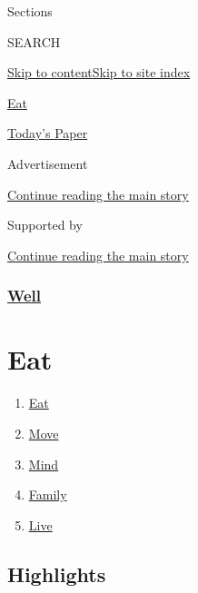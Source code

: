 Sections

SEARCH

\protect\hyperlink{site-content}{Skip to
content}\protect\hyperlink{site-index}{Skip to site index}

\href{https://www.nytimes3xbfgragh.onion/section/well/eat}{Eat}

\href{https://myaccount.nytimes3xbfgragh.onion/auth/login?response_type=cookie\&client_id=vi}{}

\href{https://www.nytimes3xbfgragh.onion/section/todayspaper}{Today's
Paper}

Advertisement

\protect\hyperlink{after-top}{Continue reading the main story}

Supported by

\protect\hyperlink{after-sponsor}{Continue reading the main story}

\hypertarget{well}{%
\subsubsection{\texorpdfstring{\href{/section/well}{Well}}{Well}}\label{well}}

\hypertarget{eat}{%
\section{Eat}\label{eat}}

\begin{enumerate}
\def\labelenumi{\arabic{enumi}.}
\tightlist
\item
  \href{/section/well/eat}{Eat}
\item
  \href{/section/well/move}{Move}
\item
  \href{/section/well/mind}{Mind}
\item
  \href{/section/well/family}{Family}
\item
  \href{/section/well/live}{Live}
\end{enumerate}

\hypertarget{highlights}{%
\subsection{Highlights}\label{highlights}}

